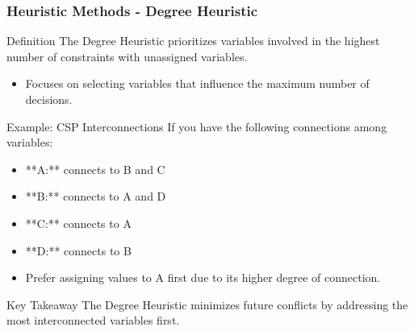 \documentclass[aspectratio=169]{beamer}
\begin{document}
\begin{frame}[fragile]
    \frametitle{Heuristic Methods - Degree Heuristic}
    \begin{block}{Definition}
        The Degree Heuristic prioritizes variables involved in the highest number of constraints with unassigned variables.
    \end{block}

    \begin{itemize}
        \item Focuses on selecting variables that influence the maximum number of decisions.
    \end{itemize}

    \begin{block}{Example: CSP Interconnections}
        If you have the following connections among variables:
        \begin{itemize}
            \item **A:** connects to B and C
            \item **B:** connects to A and D
            \item **C:** connects to A
            \item **D:** connects to B
        \end{itemize}
        \begin{itemize}
            \item Prefer assigning values to A first due to its higher degree of connection.
        \end{itemize}
    \end{block}
    
    \begin{block}{Key Takeaway}
        The Degree Heuristic minimizes future conflicts by addressing the most interconnected variables first.
    \end{block}
\end{frame}
\end{document}
